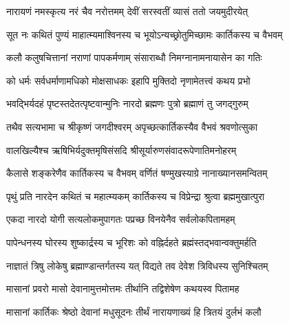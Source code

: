 \begingroup
\centering
\newcommand{\iti}[3]{\addtocounter{totalshlokas}{\value{shlokacount}}
{\centerline{\normalsize आदितः श्लोकाः — \devanumber{\value{totalshlokas}}}
॥इति श्रीस्कान्दे महापुराण एकाशीतिसाहस्र्यां संहितायां\\ द्वितीये वैष्णवखण्डे कार्तिकमासमाहात्म्ये\\#1\\ #2॥#3॥

\closesub
}
}


\twolineshloka
{नारायणं नमस्कृत्य नरं चैव नरोत्तमम्}
{देवीं सरस्वतीं व्यासं ततो जयमुदीरयेत्} %


\twolineshloka
{सूत नः कथितं पुण्यं माहात्म्यमाश्विनस्य च}
{भूयोऽन्यच्छ्रोतुमिच्छामः कार्तिकस्य च वैभवम्} %

\twolineshloka
{कलौ कलुषचित्तानां नराणां पापकर्मणाम्}
{संसाराब्धौ निमग्नानामनायासेन का गतिः} %

\twolineshloka
{को धर्मः सर्वधर्माणामधिको मोक्षसाधकः}
{इहापि मुक्तिदो नृणामेतत्त्वं कथय प्रभो} %


\twolineshloka
{भवद्भिर्यदहं पृष्टस्तदेतत्पृष्टवान्मुनिः}
{नारदो ब्रह्मणः पुत्रो ब्रह्माणं तु जगद्गुरुम्} %

\twolineshloka
{तथैव सत्यभामा च श्रीकृष्णं जगदीश्वरम्}
{अपृच्छत्कार्तिकस्यैव वैभवं श्रवणोत्सुका} %

\twolineshloka
{वालखिल्यैश्च ऋषिभिर्यदुक्तमृषिसंसदि}
{श्रीसूर्यारुणसंवादरूपेणातिमनोहरम्} %

\twolineshloka
{कैलासे शङ्करेणैव कार्तिकस्य च वैभवम्}
{वर्णितं षण्मुखस्याग्रे नानाख्यानसमन्वितम्} %

\twolineshloka
{पृथुं प्रति नारदेन कथितं च महात्म्यकम्}
{कार्तिकस्य च विप्रेन्द्रा श्रुत्वा ब्रह्ममुखात्पुरा} %

\twolineshloka
{एकदा नारदो योगी सत्यलोकमुपागतः}
{पप्रच्छ विनयेनैव सर्वलोकपितामहम्} %


\twolineshloka
{पापेन्धनस्य घोरस्य शुष्कार्द्रस्य च भूरिशः}
{को वह्निर्दहते ब्रह्मंस्तद्भवान्वक्तुमर्हति} %

\twolineshloka
{नाज्ञातं त्रिषु लोकेषु ब्रह्माण्डान्तर्गतस्य यत्}
{विद्यते तव देवेश त्रिविधस्य सुनिश्चितम्} %

\twolineshloka
{मासानां प्रवरो मासो देवानामुत्तमोत्तमः}
{तीर्थानि तद्विशेषेण कथयस्व पितामह} %


\twolineshloka
{मासानां कार्तिकः श्रेष्ठो देवानां मधुसूदनः}
{तीर्थं नारायणाख्यं हि त्रितयं दुर्लभं कलौ} %


